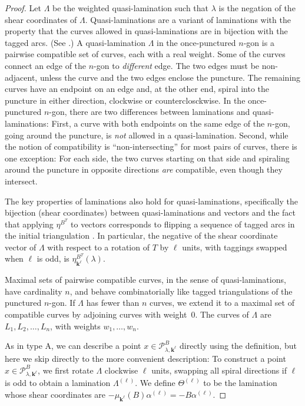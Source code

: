 \documentclass{amsart}
\theoremstyle{definition}
\theoremstyle{remark}
\numberwithin{equation}{section}
\newcommand{\0}{{\mathbf{0}}}
\newcommand{\kk}{{\boldsymbol{k}}}
\renewcommand{\P}{\mathcal{P}}
\begin{document}
\begin{proof}
Let $\Lambda$ be the weighted quasi-lamination such that $\lambda$ is the negation of the shear coordinates of $\Lambda$.
Quasi-laminations are a variant of laminations with the property that the curves allowed in quasi-laminations are in bijection with the tagged arcs.
(See \cite[Section~4]{unisurface}.)
A quasi-lamination $\Lambda$ in the once-punctured $n$-gon is a pairwise compatible set of curves, each with a real weight.
Some of the curves connect an edge of the $n$-gon to \emph{different} edge.
The two edges must be non-adjacent, unless the curve and the two edges enclose the puncture.
The remaining curves have an endpoint on an edge and, at the other end, spiral into the puncture in either direction, clockwise or counterclosckwise.
In the once-punctured $n$-gon, there are two differences between laminations and quasi-laminations:
First, a curve with both endpoints on the same edge of the $n$-gon, going around the puncture, is \emph{not} allowed in a quasi-lamination.
Second, while the notion of compatibility is ``non-intersecting'' for most pairs of curves, there is one exception:  
For each side, the two curves starting on that side and spiraling around the puncture in opposite directions \emph{are} compatible, even though they intersect.

The key properties of laminations also hold for quasi-laminations, specifically the bijection (shear coordinates) between quasi-laminations and vectors \cite[Theorem~4.4]{unisurface} and the fact that applying $\eta^{B^T}$ to vectors corresponds to flipping a sequence of tagged arcs in the initial triangulation \cite[Theorem~4.3]{unisurface}.
In particular, the negative of the shear coordinate vector of $\Lambda$ with respect to a rotation of $T$ by $\ell$ units, with taggings swapped when $\ell$ is odd, is $\eta^{B^T}_{\kk^\ell}(\lambda)$.

Maximal sets of pairwise compatible curves, in the sense of quasi-laminations, have cardinality $n$, and behave combinatorially like tagged triangulations of the punctured $n$-gon.
If $\Lambda$ has fewer than $n$ curves, we extend it to a maximal set of compatible curves by adjoining curves with weight~$0$.
The curves of $\Lambda$ are $L_1,L_2,\ldots,L_n$, with weights $w_1,\ldots,w_n$.

As in type A, we can describe a point $x\in\P^B_{\lambda,\kk^\ell}$ directly using the definition,  %
but here we skip directly to the more convenient description:
To construct a point $x\in\P^B_{\lambda,\kk^\ell}$, we first rotate $\Lambda$ clockwise $\ell$ units, swapping all spiral directions if $\ell$ is odd to obtain a lamination $\Lambda^{(\ell)}$.
We define $\Theta^{(\ell)}$ to be the lamination whose shear coordinates are $-\mu_{\kk^\ell}(B)\alpha^{(\ell)}=-B\alpha^{(\ell)}$.


\end{proof}
\end{document}
